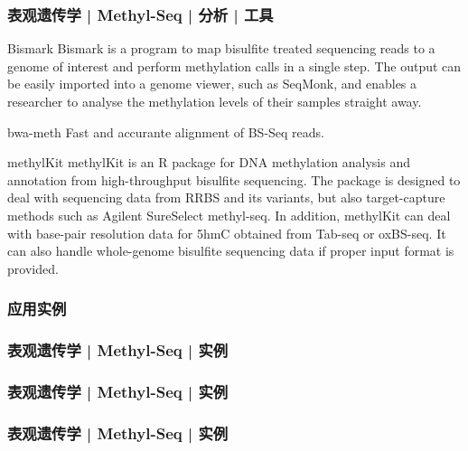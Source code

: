 \begin{frame}
  \frametitle{表观遗传学 | Methyl-Seq | 分析 | 工具}
  {\footnotesize
  \begin{block}{Bismark}
    Bismark is a program to map bisulfite treated sequencing reads to a genome of interest and perform methylation calls in a single step. The output can be easily imported into a genome viewer, such as SeqMonk, and enables a researcher to analyse the methylation levels of their samples straight away.
  \end{block}
  \pause
  \begin{block}{bwa-meth}
  Fast and accurante alignment of BS-Seq reads.
  \end{block}
  \pause
  \begin{block}{methylKit}
    methylKit is an R package for DNA methylation analysis and annotation from high-throughput bisulfite sequencing. The package is designed to deal with sequencing data from RRBS and its variants, but also target-capture methods such as Agilent SureSelect methyl-seq. In addition, methylKit can deal with base-pair resolution data for 5hmC obtained from Tab-seq or oxBS-seq. It can also handle whole-genome bisulfite sequencing data if proper input format is provided.
  \end{block}
  }
\end{frame}

\subsubsection{应用实例}
\begin{frame}
  \frametitle{表观遗传学 | Methyl-Seq | 实例}
\end{frame}

\begin{frame}
  \frametitle{表观遗传学 | Methyl-Seq | 实例}
\end{frame}

\begin{frame}
  \frametitle{表观遗传学 | Methyl-Seq | 实例}
\end{frame}

